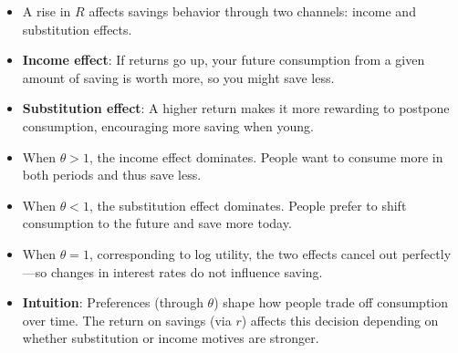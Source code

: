 \documentclass[12pt]{article}
\begin{document}
\begin{itemize}
\item A rise in \( R \) affects savings behavior through two channels: income and substitution effects.

\item \textbf{Income effect}: If returns go up, your future consumption from a given amount of saving is worth more, so you might save less.

\item \textbf{Substitution effect}: A higher return makes it more rewarding to postpone consumption, encouraging more saving when young.

\item When \( \theta > 1 \), the income effect dominates. People want to consume more in both periods and thus save less.

\item When \( \theta < 1 \), the substitution effect dominates. People prefer to shift consumption to the future and save more today.

\item When \( \theta = 1 \), corresponding to log utility, the two effects cancel out perfectly—so changes in interest rates do not influence saving.

\item \textbf{Intuition}: Preferences (through \( \theta \)) shape how people trade off consumption over time. The return on savings (via \( r \)) affects this decision depending on whether substitution or income motives are stronger.
\end{itemize}
\end{document}

